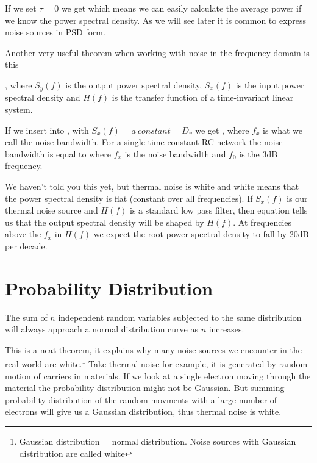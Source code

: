 \documentclass[final,a4paper]{IEEEtran}
\begin{document}
If we set $\tau=0$ we get
which means we can easily calculate the average power if we know the
power spectral density.
As we will see later it is common to express noise sources in PSD
form. 

Another very useful theorem when working with noise in the frequency
domain is this

, where $S_y(f)$ is the output power spectral density, $S_x(f)$ is the
input power spectral density and $H(f)$ is the transfer function of
a time-invariant linear system. 

If we insert  into  , with $S_x(f) =
a\:constant = D_v$
we get
, where $f_x$ is what we call the noise bandwidth. For a single
time constant RC network the noise bandwidth is equal to
where $f_x$ is the noise bandwidth and $f_0$ is the 3dB frequency.

We haven't told you this yet, but thermal noise is white and white
means that the power spectral density is flat (constant over all
frequencies).  If $S_x(f)$ is our thermal noise source
and $H(f)$ is a standard low pass filter, then equation  tells
us that the output spectral density will be shaped by $H(f)$. At
frequencies above the $f_x$ in $H(f)$ we expect the root power spectral
density to fall by 20dB per decade. 


\section{Probability Distribution}

\begin{theorem}
The sum of $n$ independent random variables subjected to the same
distribution will always approach a normal distribution curve as $n$ increases.
\end{theorem}

This is a neat theorem, it explains why many noise sources we
encounter in the real world are white.\footnote{Gaussian distribution
  = normal distribution. Noise sources with Gaussian distribution are
  called white} Take thermal noise for example,
it is generated by random motion of carriers in materials. If we look
at a single electron moving through the material the probability
distribution might not be Gaussian. But summing probability
distribution of the random movments with
a large number of electrons will give us a Gaussian distribution, thus
thermal noise is white.
\end{document}

